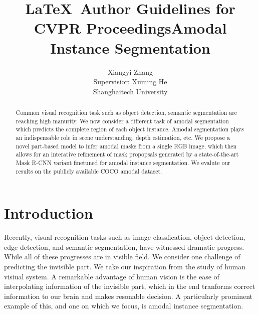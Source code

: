 \documentclass[10pt,twocolumn,letterpaper]{article}
\begin{document}
\title{\LaTeX\ Author Guidelines for CVPR Proceedings}

\title{Amodal Instance Segmentation}

\author{Xiangyi Zhang\\
Supervisior: Xuming He\\
Shanghaitech University\\
}


\maketitle

\begin{abstract}
   Common visual recognition task such as object detection, semantic segmentation
   are reaching high manurity. We now consider a different task of amodal segmentation
   which predicts the complete region of each object instance.  Amodal 
   segmentation plays an indispensable role in scene understanding, depth estimation,
   etc. We propose a novel part-based model  to infer amodal masks
   from a single RGB image, which then allows for an interative refinement of mask propopsals
   generated by a state-of-the-art Mask R-CNN variant finetuned for amodal instance 
   segmentation. We evalute our results on the publicly available COCO amodal dataset.
\end{abstract}

\section{Introduction}
Recently, visual recognition tasks such as image classfication\cite{witten2016data,he2016deep}, object detection\cite{felzenszwalb2010object,sermanet2013overfeat}, edge detection\cite{arbelaez2011contour},
and semantic segmentation\cite{shotton2006textonboost,pinheiro2014recurrent,long2015fully}, have witnessed dramatic progress. While all of these progresses are in visible
field. We consider one challenge of predicting the invisible part. We take our inspiration
from the study of human visiual system. A remarkable advantage of human vision is the ease of interpolating
information of the invisible part, which in the end tranforms correct information to our brain and 
makes resonable decision. A particularly prominent example of this, and one on which we focus, is 
amodal instance segmentation.
\end{document}
